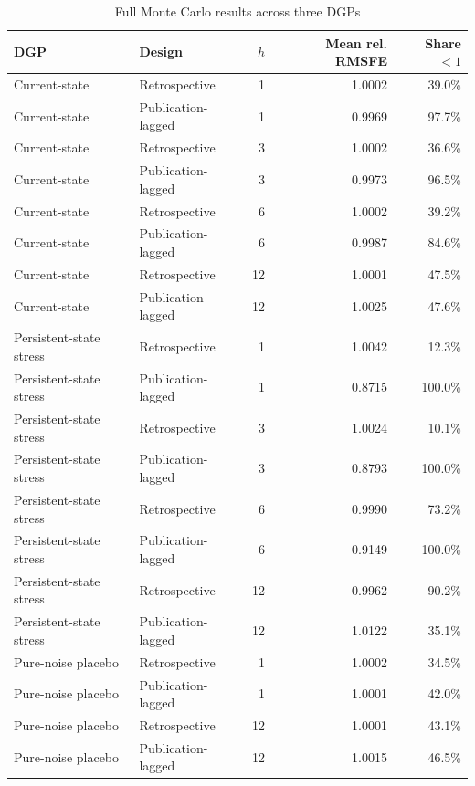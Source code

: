 \documentclass[preprint,12pt,authoryear]{elsarticle}
\begin{document}
\begin{table}[htbp]
\centering\scriptsize
\caption{Full Monte Carlo results across three DGPs}
\begin{tabular}{llrrr}
\toprule
DGP & Design & $h$ & Mean rel. RMSFE & Share $<1$\\
\midrule
Current-state & Retrospective & 1 & 1.0002 & 39.0\%\\
Current-state & Publication-lagged & 1 & 0.9969 & 97.7\%\\
Current-state & Retrospective & 3 & 1.0002 & 36.6\%\\
Current-state & Publication-lagged & 3 & 0.9973 & 96.5\%\\
Current-state & Retrospective & 6 & 1.0002 & 39.2\%\\
Current-state & Publication-lagged & 6 & 0.9987 & 84.6\%\\
Current-state & Retrospective & 12 & 1.0001 & 47.5\%\\
Current-state & Publication-lagged & 12 & 1.0025 & 47.6\%\\
\midrule
Persistent-state stress & Retrospective & 1 & 1.0042 & 12.3\%\\
Persistent-state stress & Publication-lagged & 1 & 0.8715 & 100.0\%\\
Persistent-state stress & Retrospective & 3 & 1.0024 & 10.1\%\\
Persistent-state stress & Publication-lagged & 3 & 0.8793 & 100.0\%\\
Persistent-state stress & Retrospective & 6 & 0.9990 & 73.2\%\\
Persistent-state stress & Publication-lagged & 6 & 0.9149 & 100.0\%\\
Persistent-state stress & Retrospective & 12 & 0.9962 & 90.2\%\\
Persistent-state stress & Publication-lagged & 12 & 1.0122 & 35.1\%\\
\midrule
Pure-noise placebo & Retrospective & 1 & 1.0002 & 34.5\%\\
Pure-noise placebo & Publication-lagged & 1 & 1.0001 & 42.0\%\\
Pure-noise placebo & Retrospective & 12 & 1.0001 & 43.1\%\\
Pure-noise placebo & Publication-lagged & 12 & 1.0015 & 46.5\%\\
\bottomrule
\end{tabular}
\end{table}
\end{document}

